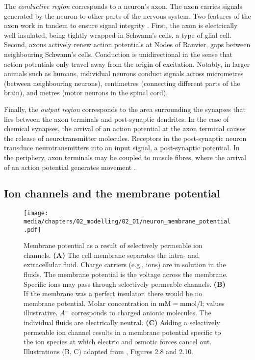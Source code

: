 The \emph{conductive region} corresponds to a neuron's axon.
The axon carries signals generated by the neuron to other parts of the nervous system.
Two features of the axon work in tandem to ensure signal integrity \citep[Chapter~7]{kandel2012principles}.
First, the axon is electrically well insulated, being tightly wrapped in Schwann's cells, a type of glial cell.
Second, axons actively renew action potentials at Nodes of Ranvier, gaps between neighbouring Schwann's cells.
Conduction is unidirectional in the sense that action potentials only travel away from the origin of excitation.
Notably, in larger animals such as humans, individual neurons conduct signals across micrometres (between neighbouring neurons), centimetres (connecting different parts of the brain), and metres (motor neurons in the spinal cord).%

Finally, the \emph{output region} corresponds to the area surrounding the synapses that lies between the axon terminals and post-synaptic dendrites.
In the case of chemical synapses, the arrival of an action potential at the axon terminal causes the release of neurotransmitter molecules.
Receptors in the post-synaptic neuron transduce neurotransmitters into an input signal, a post-synaptic potential.
In the periphery, axon terminals may be coupled to muscle fibres, where the arrival of an action potential generates movement \citep[Chapter~8~\&~9]{kandel2012principles}.

\subsection{Ion channels and the membrane potential}
\label{sec:membrane_potential}

\begin{figure}
	\centering
	{\label{fig:neuron_membrane_potential_membrane}}%
	{\label{fig:neuron_membrane_potential_membrane_isolated}}%
	{\label{fig:neuron_membrane_potential_membrane_channel}}%
	\texttt{[image: media/chapters/02\_modelling/02\_01/neuron\_membrane\_potential.pdf]}
	\caption[Membrane potential as a result of selectively permeable ion channels]{
	Membrane potential as a result of selectively permeable ion channels.
	\textbf{(A)} The cell membrane separates the intra- and extracellular fluid. Charge carriers (e.g., ions) are in solution in the fluids. The membrane potential is the voltage \vMem across the membrane.
	Specific ions may pass through selectively permeable channels.
	\textbf{(B)} If the membrane was a perfect insulator, there would be no membrane potential. Molar concentration in $\mathrm{mM} = \si{\milli\mole\per\litre}$; values illustrative. $A^-$ corresponds to charged anionic molecules.
	The individual fluids are electrically neutral.
	\textbf{(C)} Adding a selectively permeable ion channel results in a membrane potential specific to the ion species at which electric and osmotic forces cancel out.
	Illustrations (B, C) adapted from \citet{reichert2000neurobiologie}, Figures 2.8 and 2.10.}
\end{figure}

